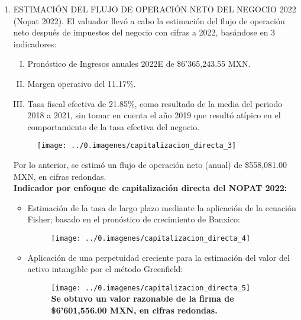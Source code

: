 \begin{enumerate}[1)]
\item ESTIMACIÓN DEL FLUJO DE OPERACIÓN NETO DEL NEGOCIO 2022 (Nopat 2022). El valuador llevó a cabo la estimación del flujo de operación neto después de impuestos del negocio con cifras a 2022, basándose en 3 indicadores: 

\begin{enumerate}[I.]

\item Pronóstico de Ingresos anuales 2022E de \$6’365,243.55 MXN.
\item Margen operativo del 11.17\%.
\item Tasa fiscal efectiva de  21.85\%, como resultado de la media del periodo 2018 a 2021, sin tomar en cuenta el año 2019 que resultó atípico en el comportamiento de la tasa efectiva del negocio.

\end{enumerate}

\begin{figure}[H]
\centering
\texttt{[image: ../0.imagenes/capitalizacion\_directa\_3]}
\end{figure}

Por lo anterior, se estimó un flujo de operación neto (anual) de \$558,081.00 MXN, en cifras redondas.\\

\textbf{Indicador por enfoque de capitalización directa del NOPAT 2022:}\\

\begin{itemize}

\item Estimación de la tasa de largo plazo mediante la aplicación de la ecuación Fisher; basado en el pronóstico de crecimiento de Banxico:

\begin{figure}[H]
\centering
\texttt{[image: ../0.imagenes/capitalizacion\_directa\_4]}
\end{figure}

\item Aplicación de una perpetuidad creciente para la estimación del valor del activo intangible por el método Greenfield:

\begin{figure}[H]
\centering
\texttt{[image: ../0.imagenes/capitalizacion\_directa\_5]}\\
\textbullet\textbf{Se obtuvo un valor razonable de la firma de \$6'601,556.00 MXN, en cifras redondas.}
\end{figure}
\end{itemize}


\end{enumerate}
